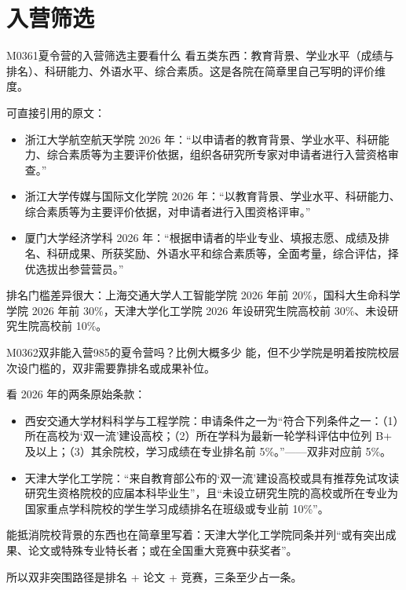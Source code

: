 \section{入营筛选}
\begin{qa}{M0361}{夏令营的入营筛选主要看什么}
看五类东西：教育背景、学业水平（成绩与排名）、科研能力、外语水平、综合素质。这是各院在简章里自己写明的评价维度。

可直接引用的原文：
\begin{itemize}
  \item 浙江大学航空航天学院 2026 年：“以申请者的教育背景、学业水平、科研能力、综合素质等为主要评价依据，组织各研究所专家对申请者进行入营资格审查。”
  \item 浙江大学传媒与国际文化学院 2026 年：“以教育背景、学业水平、科研能力、综合素质等为主要评价依据，对申请者进行入围资格评审。”
  \item 厦门大学经济学科 2026 年：“根据申请者的毕业专业、填报志愿、成绩及排名、科研成果、所获奖励、外语水平和综合素质等，全面考量，综合评估，择优选拔出参营营员。”
\end{itemize}

排名门槛差异很大：上海交通大学人工智能学院 2026 年前 20\%，国科大生命科学学院 2026 年前 30\%，天津大学化工学院 2026 年设研究生院高校前 30\%、未设研究生院高校前 10\%。
\end{qa}

\begin{qa}{M0362}{双非能入营985的夏令营吗？比例大概多少}
能，但不少学院是明着按院校层次设门槛的，双非需要靠排名或成果补位。

看 2026 年的两条原始条款：
\begin{itemize}
  \item 西安交通大学材料科学与工程学院：申请条件之一为“符合下列条件之一：（1）所在高校为‘双一流’建设高校；（2）所在学科为最新一轮学科评估中位列 B+ 及以上；（3）其余院校，学习成绩在专业排名前 5\%。”——双非对应前 5\%。
  \item 天津大学化工学院：“来自教育部公布的‘双一流’建设高校或具有推荐免试攻读研究生资格院校的应届本科毕业生”，且“未设立研究生院的高校或所在专业为国家重点学科院校的学生学习成绩排名在班级或专业前 10\%”。
\end{itemize}

能抵消院校背景的东西也在简章里写着：天津大学化工学院同条并列“或有突出成果、论文或特殊专业特长者；或在全国重大竞赛中获奖者”。

所以双非突围路径是排名 + 论文 + 竞赛，三条至少占一条。
\end{qa}

